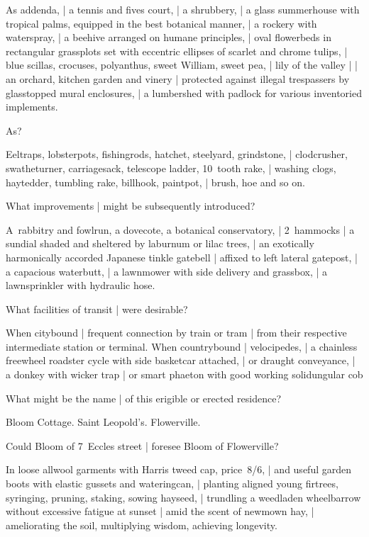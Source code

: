 \Household
As addenda, |
a tennis and fives court, |
a shrubbery, |
a glass summerhouse with tropical palms, equipped in the best botanical manner, |
a rockery with waterspray, |
a beehive arranged on humane principles, |
oval flowerbeds in rectangular grassplots
set with eccentric ellipses of scarlet and chrome tulips, |
blue scillas, crocuses, polyanthus,
sweet William, sweet pea, |
lily of the valley |
 |
an orchard, kitchen garden and vinery |
protected against illegal trespassers by glasstopped mural enclosures, |
a lumbershed with padlock for various inventoried implements.


As?

\Household
Eeltraps, lobsterpots, fishingrods, hatchet, steelyard, grindstone, |
clodcrusher, swatheturner, carriagesack, telescope ladder, 10~tooth rake, |
washing clogs, hay\-tedder, tumbling rake, billhook, paintpot, |
brush, hoe and so on.

What improvements |
might be subsequently introduced?

\Household
A~rabbitry and fowlrun, a dovecote, a botanical conservatory, |
2~hammocks
 |
a sundial shaded and sheltered by laburnum or lilac trees, |
an exotically harmonically accorded Japanese tinkle gatebell |
affixed to left lateral gatepost, |
a capacious waterbutt, |
a lawnmower with side delivery and grassbox, |
a lawnsprinkler with hydraulic hose.


What facilities of transit |
were desirable?

\Places
When citybound |
frequent connection by train or tram |
from their respective intermediate station or terminal.
When countrybound |
velocipedes, |
a chainless freewheel roadster cycle with side basketcar attached, |
or draught conveyance, |
a donkey with wicker trap |
or smart phaeton with good working solidungular cob


What might be the name |
of this erigible or erected residence?

\Bloom
Bloom Cottage.
Saint Leopold's.
Flowerville.



Could Bloom of 7~Eccles street |
foresee Bloom of Flowerville?

\Philosophy
In loose allwool garments with Harris tweed cap, price~8/6, |
and useful garden boots with elastic gussets and wateringcan, |
planting aligned young firtrees, syringing, pruning, staking, sowing hayseed, |
trundling a weedladen wheelbarrow without excessive fatigue at sunset |
amid the scent of newmown hay, |
ameliorating the soil, multiplying wisdom, achieving longevity.


